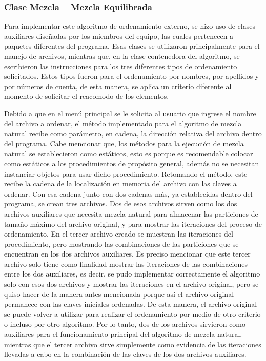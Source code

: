\documentclass[11pt]{article}
\begin{document}
\subsubsection{Clase Mezcla -- Mezcla Equilibrada}
\par
Para implementar este algoritmo de ordenamiento externo, se hizo uso de clases auxiliares diseñadas por los miembros del equipo, las cuales pertenecen a paquetes diferentes del programa. Esas clases se utilizaron principalmente para el manejo de archivos, mientras que, en la clase contenedora del algoritmo, se escribieron las instrucciones para los tres diferentes tipos de ordenamiento solicitados. Estos tipos fueron para el ordenamiento por nombres, por apellidos y por números de cuenta, de esta manera, se aplica un criterio diferente al momento de solicitar el reacomodo de los elementos. 
\par
Debido a que en el menú principal se le solicita al usuario que ingrese el nombre del archivo a ordenar, el método implementado para el algoritmo de mezcla natural recibe como parámetro, en cadena, la dirección relativa del archivo dentro del programa. Cabe mencionar que, los métodos para la ejecución de mezcla natural se establecieron como estáticos, esto es porque es recomendable colocar como estáticos a los procedimientos de propósito general, además no se necesitan instanciar objetos para usar dicho procedimiento. Retomando el método, este recibe la cadena de la localización en memoria del archivo con las claves a ordenar. Con esa cadena junto con dos cadenas más, ya establecidas dentro del programa, se crean tres archivos. Dos de esos archivos sirven como los dos archivos auxiliares que necesita mezcla natural para almacenar las particiones de tamaño máximo del archivo original, y para mostrar las iteraciones del proceso de ordenamiento. En el tercer archivo creado se muestran las iteraciones del procedimiento, pero mostrando las combinaciones de las particiones que se encuentran en los dos archivos auxiliares. Es preciso mencionar que este tercer archivo solo tiene como finalidad mostrar las iteraciones de las combinaciones entre los dos auxiliares, es decir, se pudo implementar correctamente el algoritmo solo con esos dos archivos y mostrar las iteraciones en el archivo original, pero se quiso hacer de la manera antes mencionada porque así el archivo original permanece con las claves iniciales ordenadas. De esta manera, el archivo original se puede volver a utilizar para realizar el ordenamiento por medio de otro criterio o incluso por otro algoritmo. Por lo tanto, dos de los archivos sirvieron como auxiliares para el funcionamiento principal del algoritmo de mezcla natural, mientras que el tercer archivo sirve simplemente como evidencia de las iteraciones llevadas a cabo en la combinación de las claves de los dos archivos auxiliares.
\end{document}
